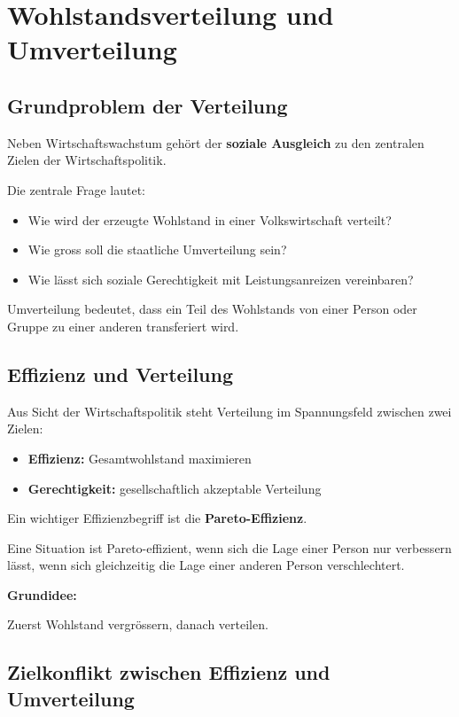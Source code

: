 \section{Wohlstandsverteilung und Umverteilung}

\subsection{Grundproblem der Verteilung}

Neben Wirtschaftswachstum gehört der \textbf{soziale Ausgleich} zu den zentralen Zielen der Wirtschaftspolitik.

Die zentrale Frage lautet:

\begin{itemize}
\item Wie wird der erzeugte Wohlstand in einer Volkswirtschaft verteilt?
\item Wie gross soll die staatliche Umverteilung sein?
\item Wie lässt sich soziale Gerechtigkeit mit Leistungsanreizen vereinbaren?
\end{itemize}

Umverteilung bedeutet, dass ein Teil des Wohlstands von einer Person oder Gruppe zu einer anderen transferiert wird.

\subsection{Effizienz und Verteilung}

Aus Sicht der Wirtschaftspolitik steht Verteilung im Spannungsfeld zwischen zwei Zielen:

\begin{itemize}
\item \textbf{Effizienz:} Gesamtwohlstand maximieren
\item \textbf{Gerechtigkeit:} gesellschaftlich akzeptable Verteilung
\end{itemize}

Ein wichtiger Effizienzbegriff ist die \textbf{Pareto-Effizienz}.

Eine Situation ist Pareto-effizient, wenn sich die Lage einer Person nur verbessern lässt, wenn sich gleichzeitig die Lage einer anderen Person verschlechtert.

\textbf{Grundidee:}

Zuerst Wohlstand vergrössern, danach verteilen.

\subsection{Zielkonflikt zwischen Effizienz und Umverteilung}


